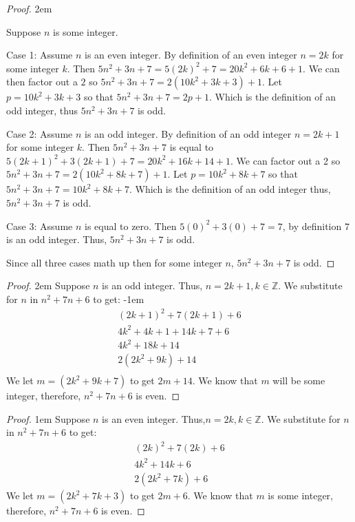 \documentclass[12 pt]{article}
\newcommand{\Z}{\mathbb{Z}}
\theoremstyle{definition}
\theoremstyle{plain}
\theoremstyle{mytheorem}
\theoremstyle{myexample}
\theoremstyle{mydefinition}
\begin{document}
\begin{proof} \openup 2em{Suppose $n$ is some integer.
\begin{description}
\item {Case 1:} Assume $n$ is an even integer.  By definition of an even integer $n=2k$ for some integer $k$.  Then $5n^2+3n+7=5(2k)^2+7=20k^2+6k+6+1.$  We can then factor out a $2$ so $5n^2+3n+7=2(10k^2+3k+3)+1$.  Let $p = 10k^2+3k+3$ so that $5n^2+3n+7=2p+1$.  Which is the definition of an odd integer, thus $5n^2+3n+7$ is odd.
\item{Case 2:} Assume $n$ is an odd integer.  By definition of an odd integer $n=2k+1$ for some integer $k$.  Then $5n^2+3n+7$ is equal to $5(2k+1)^2+3(2k+1)+7=20k^2+16k+14+1$.  We can factor out a 2 so $5n^2+3n+7=2(10k^2+8k+7)+1$.  Let $p=10k^2+8k+7$ so that $5n^2+3n+7=10k^2+8k+7$.  Which is the definition of an odd integer thus, $5n^2+3n+7$ is odd.
\item{Case 3:} Assume $n$ is equal to zero.  Then $5(0)^2+3(0)+7=7$, by definition $7$ is an odd integer.  Thus, $5n^2+3n+7$ is odd.  
\end{description}
Since all three cases math up then for some integer $n$, $5n^2+3n+7$ is odd.}
\end{proof}

\begin{center} \underline{\hspace{\textwidth}} \end{center}

\begin{proof} \openup 2em 
Suppose $n$ is an odd integer.  Thus, $n=2k+1,k\in\Z$.  We substitute for $n$ in $n^2+7n+6$ to get:
\openup -1em
	\begin{align*}
	(2k+1)^2+7(2k+1)+6\\
	4k^2+4k+1+14k+7+6\\
	4k^2+18k+14\\
	2(2k^2+9k)+14\\
	\end{align*}
We let $m=(2k^2+9k+7)$ to get $2m+14$.  We know that $m$ will be some integer, therefore, $n^2+7n+6$ is even.
\end{proof}

\begin{proof} \openup 1em
Suppose $n$ is an even integer.  Thus,$n=2k,k\in\Z$.  We substitute for $n$ in $n^2+7n+6$ to get:
	\begin{align*}
	(2k)^2+7(2k)+6\\
	4k^2+14k+6\\
	2(2k^2+7k)+6
	\end{align*}
We let $m=(2k^2+7k+3)$ to get $2m+6$.  We know that $m$ is some integer, therefore, $n^2+7n+6$ is even.
\end{proof}
\begin{center} \underline{\hspace{\textwidth}}\\ \underline{\hspace{\textwidth}} \end{center}\newpage
\end{document}
